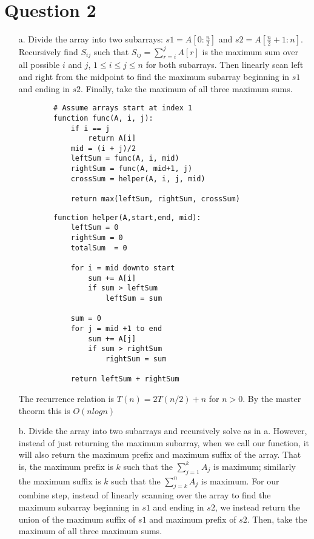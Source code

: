 \documentclass[12pt]{article}
\begin{document}
\section*{Question 2}
\begin{enumerate}
    \item[a.] Divide the array into two subarrays: $s1 = A[0:\frac{n}{2}]$ and $s2 = A[\frac{n}{2} + 1:n]$. Recursively find $S_{ij}$ such that $S_{ij} = \sum_{r=i}^j A[r]$ is the maximum sum over all possible $i$ and $j$, $1 \leq i \leq j \leq n$ for both subarrays. Then linearly scan left and right from the midpoint to find the maximum subarray beginning in $s1$ and ending in $s2$. Finally, take the maximum of all three maximum sums. 
    \begin{verbatim}
        # Assume arrays start at index 1
        function func(A, i, j):
            if i == j
                return A[i]
            mid = (i + j)/2
            leftSum = func(A, i, mid)
            rightSum = func(A, mid+1, j)
            crossSum = helper(A, i, j, mid)
        
            return max(leftSum, rightSum, crossSum)
    \end{verbatim}
    
    \begin{verbatim}
        function helper(A,start,end, mid):
            leftSum = 0
            rightSum = 0
            totalSum  = 0
        
            for i = mid downto start
                sum += A[i]
                if sum > leftSum
                    leftSum = sum
            
            sum = 0
            for j = mid +1 to end
                sum += A[j]
                if sum > rightSum
                    rightSum = sum
            
            return leftSum + rightSum
    \end{verbatim}
    
    The recurrence relation is $T(n) = 2T(n/2) + n$ for $n>0$. By the master theorm this is $O(nlogn)$
    
    \item[b.] Divide the array into two subarrays and recursively solve as in a. However, instead of just returning the maximum subarray, when we call our function, it will also return the maximum prefix and maximum suffix of the array. That is, the maximum prefix is $k$ such that the $\sum_{j=1}^k A_j$ is maximum; similarly the maximum suffix is $k$ such that the $\sum_{j=k}^n A_j$ is maximum. For our combine step, instead of linearly scanning over the array to find the maximum subarray beginning in $s1$ and ending in $s2$, we instead return the union of the maximum 
    suffix of $s1$ and maximum prefix of $s2$. Then, take the maximum of all three maximum sums.


\end{enumerate}
\end{document}
